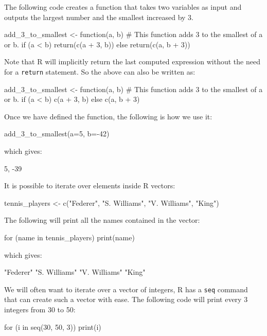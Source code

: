The following code creates a function that takes two variables as input and
outputs the largest number and the smallest increased by 3.

\begin{Rin}
add_3_to_smallest <- function(a, b) {
  # This function adds 3 to the smallest of a or b.
  if (a < b) {
    return(c(a + 3, b))
  }
  else {
    return(c(a, b + 3))
  }
}
\end{Rin}

Note that R will implicitly return the last computed expression without the need
for a \texttt{return} statement. So the above can also be written as:

\begin{Rin}
add_3_to_smallest <- function(a, b) {
  # This function adds 3 to the smallest of a or b.
  if (a < b) {
    c(a + 3, b)
  }
  else {
    c(a, b + 3)
  }
}
\end{Rin}

Once we have defined the function, the following is how we use it:

\begin{Rin}
add_3_to_smallest(a=5, b=-42)
\end{Rin}

which gives:

\begin{Rout}
5, -39
\end{Rout}

It is possible to iterate over elements inside R vectors:

\begin{Rin}
tennis_players <- c("Federer", "S. Williams", "V. Williams", "King")
\end{Rin}

The following will print all the names contained in the vector:

\begin{Rin}
for (name in tennis_players) {
    print(name)
}
\end{Rin}

which gives:

\begin{Rout}
"Federer"
"S. Williams"
"V. Williams"
"King"
\end{Rout}

We will often want to iterate over a vector of integers, R has a \texttt
{seq}
command that can create such a vector with ease. The following
code will print every 3 integers from 30 to 50:

\begin{Rin}
for (i in seq(30, 50, 3)) {
  print(i)
}
\end{Rin}

